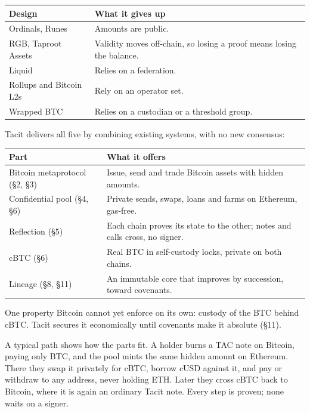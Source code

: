 \documentclass[11pt,letterpaper]{article}
\begin{document}
\begin{center}\small
\begin{tabular}{@{}ll@{}}
\toprule
\textbf{Design} & \textbf{What it gives up} \\
\midrule
Ordinals, Runes & Amounts are public. \\
RGB, Taproot Assets & Validity moves off-chain, so losing a proof means losing the balance. \\
Liquid & Relies on a federation. \\
Rollups and Bitcoin L2s & Rely on an operator set. \\
Wrapped BTC & Relies on a custodian or a threshold group. \\
\bottomrule
\end{tabular}
\end{center}

Tacit delivers all five by combining existing systems, with no new consensus:

\begin{center}\small
\begin{tabular}{@{}ll@{}}
\toprule
\textbf{Part} & \textbf{What it offers} \\
\midrule
Bitcoin metaprotocol (\S2, \S3) & Issue, send and trade Bitcoin assets with hidden amounts. \\
Confidential pool (\S4, \S6) & Private sends, swaps, loans and farms on Ethereum, gas-free. \\
Reflection (\S5) & Each chain proves its state to the other; notes and calls cross, no signer. \\
cBTC (\S6) & Real BTC in self-custody locks, private on both chains. \\
Lineage (\S8, \S11) & An immutable core that improves by succession, toward covenants. \\
\bottomrule
\end{tabular}
\end{center}

One property Bitcoin cannot yet enforce on its own: custody of the BTC behind cBTC. Tacit secures it
economically until covenants make it absolute (\S11).

A typical path shows how the parts fit. A holder burns a TAC note on Bitcoin, paying only BTC, and the
pool mints the same hidden amount on Ethereum. There they swap it privately for cBTC, borrow cUSD against
it, and pay or withdraw to any address, never holding ETH. Later they cross cBTC back to Bitcoin, where
it is again an ordinary Tacit note. Every step is proven; none waits on a signer.
\end{document}

